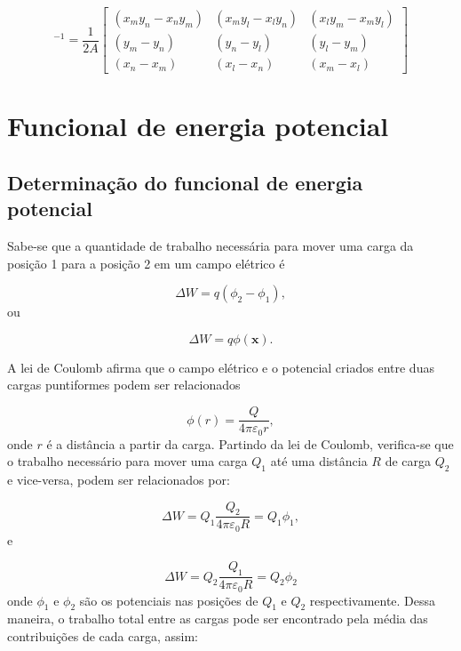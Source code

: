 \documentclass[
12pt,
a4paper,
oneside,
chapter=TITLE,
sumario=tradicional
]{abntex2}
\begin{document}
\begin{equation} %
	[M]^{-1}=\frac{1}{2A}
	\begin{bmatrix}
		(x_m y_n - x_n y_m) & (x_m y_l - x_l y_n) & (x_l y_m - x_m y_l) \\
		(y_m - y_n) & (y_n - y_l) & (y_l - y_m) \\
		(x_n - x_m) & (x_l - x_n) & (x_m - x_l)
	\end{bmatrix}
	\label{eq:A_005}
\end{equation}	

\chapter{Funcional de energia potencial} \label{App:Funcionalendix_B}
\section*{Determinação do funcional de energia potencial}
Sabe-se que a quantidade de trabalho necessária para mover uma carga da posição 1 para a posição 2 em um campo elétrico é

\begin{equation}
	\Delta W = q(\phi_2 - \phi_1), 
	\label{eq:B_001}
\end{equation}
ou

\begin{equation}
	\Delta W = q \phi(\mathbf{x}).
	\label{eq:B_002}
\end{equation}

A lei de Coulomb afirma que  o campo elétrico e o potencial criados entre duas  cargas puntiformes podem ser relacionados 


\begin{equation}
	\phi(r) = \frac{Q}{4 \pi \varepsilon_0 r},  
	\label{eq:B_003}
\end{equation}
onde $r$ é a distância a partir da carga. 
Partindo da lei de Coulomb, verifica-se que o trabalho necessário para mover uma carga  $Q_1$ até uma distância $R$ de carga $Q_2$ e vice-versa, podem ser relacionados  por:

\begin{equation}
	\Delta W = Q_1 \frac{Q_2}{4 \pi \varepsilon_0 R} = Q_1 \phi_1,
	\label{eq:B_004}
\end{equation}
e

\begin{equation}
	\Delta W = Q_2 \frac{Q_1}{4 \pi \varepsilon_0 R} = Q_2 \phi_2
	\label{eq:B_005}
\end{equation}
onde $\phi_1$  e $\phi_2$ são os potenciais nas posições de $Q_1$  e $Q_2$ respectivamente. Dessa maneira, o trabalho total entre as cargas pode ser encontrado pela média das contribuições de cada carga, assim: 
\end{document}
